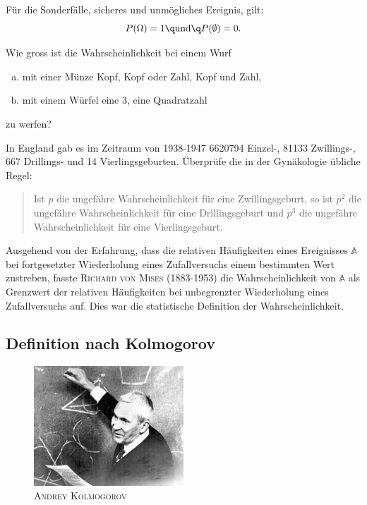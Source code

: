 \documentclass[%
11pt,%
twoside,%
titlepage,%
german,%
headsepline%
]{scrartcl}
\newcommand{\faEyeLightGray}{\textcolor{lightgray}{\faEye}} %
\newcommand{\concatueb}[1]{ueb:#1}%
\newcommand{\concatlsg}[1]{lsg:#1}%
\newcommand{\uebh}[2]{%
  \begin{ueb}\label{\concatueb{#1}} %
    #2
    \hfill\hyperref[\concatlsg{#1}]{\faEyeLightGray}
  \end{ueb}%
}
\begin{document}
\begin{bem}
Für die Sonderfälle, sicheres und unm\"ogliches Ereignis, gilt:
$$P(\Omega)=1\q\text{und}\q P(\emptyset)=0.$$
\end{bem}

\uebh{kopfoderzahl}{
Wie gross ist die Wahrscheinlichkeit bei einem Wurf
\begin{enumerate}[a)]
\item mit einer Münze Kopf, Kopf oder Zahl, Kopf und Zahl,
\item mit einem Würfel eine 3, eine Quadratzahl
\end{enumerate}
zu werfen?
}

\uebh{geburtenregel}{
In England gab es im Zeitraum von 1938-1947 6620794 Einzel-, 81133 Zwillings-, 667 Drillings- und 14 Vierlingsgeburten. Überprüfe die in der Gy\-nä\-ko\-lo\-gie übliche Regel:
\begin{quote}
Ist $p$ die ungefähre Wahrscheinlichkeit für eine Zwillingsgeburt, so ist $p^2$ die ungefähre Wahrscheinlichkeit für eine Drillingsgeburt und $p^3$ die ungefähre Wahrscheinlichkeit für eine Vierlingsgeburt.
\end{quote}
}

Ausgehend von der Erfahrung, dass die relativen Häufigkeiten eines Ereignisses $\mathbb{A}$ bei fortgesetzter Wiederholung eines Zufallversuchs einem bestimmten Wert zustreben, fasste \textsc{Richard von Mises} (1883-1953) die Wahrscheinlichkeit von $\mathbb{A}$ als Grenzwert der relativen Häufigkeiten bei unbegrenzter Wiederholung eines Zufallversuchs auf. Dies war die statistische Definition der Wahrscheinlichkeit.

\subsection{Definition nach Kolmogorov}

\begin{figure}
\centering
\includegraphics[width=0.5\textwidth]{pictures/kolmogorov}
\caption{\textsc{Andrey Kolmogorov}}
\end{figure}
\end{document}
